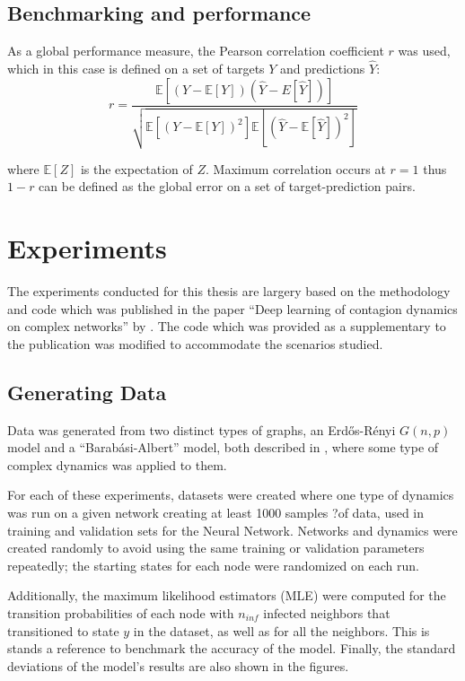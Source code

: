 \subsection{Benchmarking and performance}

As a global performance measure, the Pearson correlation coefficient $r$
was used, which in this case is defined on a set of targets $Y$ and predictions $\hat{Y}$:
\begin{equation}
  \label{eq:pearson}
  r = \frac{\mathbb{E}[(Y - \mathbb{E}[Y])(\hat{Y} - E[\hat{Y}])]}{\sqrt{
      \mathbb{E}[(Y - \mathbb{E}[Y])^2]\mathbb{E}[(\hat{Y} - \mathbb{E}[\hat{Y}])^2]}}
\end{equation}

where $\mathbb{E}[Z]$ is the expectation of $Z$. Maximum correlation occurs at
$r=1$ thus $1-r$ can be defined as the global error on a set of target-prediction
pairs.

\section{Experiments}\label{sec:exps}
The experiments conducted for this thesis are largery based on the
methodology and code which was published in the paper ``Deep learning
of contagion dynamics on complex networks'' by \citet{murphy}. The code
which was provided as a supplementary to the publication was modified to
accommodate the scenarios studied. 

\subsection{Generating Data}
Data was generated from two distinct types of graphs, an Erd{\H{o}}s-R{\'e}nyi
$G(n, p)$ model and a ``Barab{\'a}si-Albert'' model, both described in ,
where some type of complex dynamics was applied to them. 

For each of these experiments, datasets were created where one type of dynamics
was run on a given network creating at least 1000 samples ?of data, used in
training and validation sets for the Neural Network. Networks and dynamics were
created randomly to avoid using the same training or validation parameters repeatedly;
the starting states for each node were randomized on each run.

Additionally, the maximum likelihood estimators (MLE) were computed
for the transition probabilities of each node with $n_{inf}$ infected
neighbors that transitioned to state $y$ in the dataset, as well as
for all the neighbors. This is stands a reference to benchmark the
accuracy of the model. Finally, the standard deviations of the model's
results are also shown in the figures.


